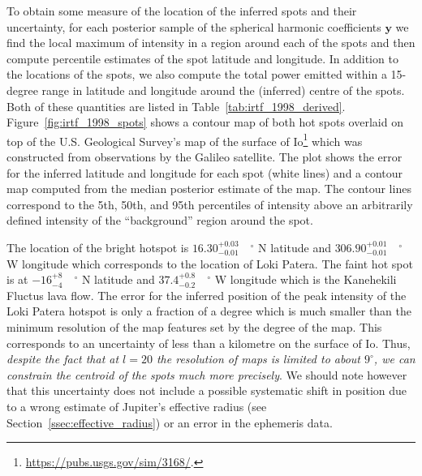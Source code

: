 \documentclass[12pt,dvipsnames]{report}
\begin{document}
To obtain some measure of the location of the inferred spots and their uncertainty, for each posterior sample of the spherical harmonic coefficients $\mathbf{y}$ we find the local maximum of intensity in a region around each of the spots and then compute percentile estimates of the spot latitude and longitude.
In addition to the locations of the spots, we also compute the total power emitted within a 15-degree range in latitude and longitude around the (inferred) centre of the spots.
Both of these quantities are listed in Table~\ref{tab:irtf_1998_derived}. 
Figure~\ref{fig:irtf_1998_spots} shows  a contour map of both hot spots overlaid on top of the U.S. 
Geological Survey's map of the surface of Io\footnote{\url{https://pubs.usgs.gov/sim/3168/}.}
which was constructed from observations by the Galileo satellite.
The plot shows the error for the inferred latitude and longitude for each spot (white lines) and a contour map computed from the median posterior estimate of the map.
The contour lines correspond to the 5th, 50th, and 95th percentiles of intensity above an arbitrarily defined intensity of the ``background'' region around the spot.

The location of the bright hotspot is $16.30_{-0.01}^{+0.03}\quad^\circ$ N latitude and $306.90_{-0.01}^{+0.01}\quad^\circ$ W longitude which corresponds to the location of Loki Patera.
The faint hot spot is at $-16_{-4}^{+8}\quad ^\circ$ N latitude and $37.4_{-0.2}^{+0.8}\quad^\circ$ W longitude which is the Kanehekili Fluctus lava flow.
The error for the inferred position of the peak intensity of the Loki Patera hotspot is only a fraction of a degree which is much smaller than the minimum resolution of the map features set by the degree of the map.
This corresponds to an uncertainty of less than a kilometre on the surface of Io.
Thus, \emph{despite the fact that at $l=20$ the resolution of maps is limited to about $9^\circ$, we can constrain the centroid of the spots much more precisely}.
We should note however that this uncertainty does not include a possible systematic shift in position due to a wrong estimate of Jupiter's effective radius (see Section~\ref{ssec:effective_radius}) or an error in the ephemeris data.
\end{document}
